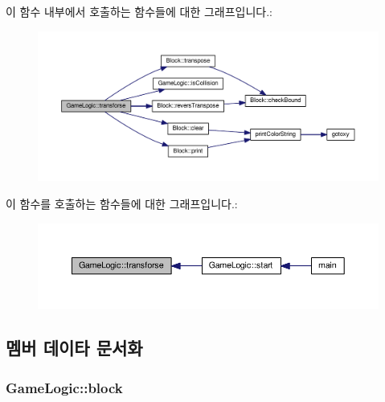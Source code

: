 이 함수 내부에서 호출하는 함수들에 대한 그래프입니다.\+:
\nopagebreak
\begin{figure}[H]
\begin{center}
\leavevmode
\includegraphics[width=350pt]{class_game_logic_abd2dece64def6dc89e0b116fdca83483_cgraph}
\end{center}
\end{figure}




이 함수를 호출하는 함수들에 대한 그래프입니다.\+:
\nopagebreak
\begin{figure}[H]
\begin{center}
\leavevmode
\includegraphics[width=350pt]{class_game_logic_abd2dece64def6dc89e0b116fdca83483_icgraph}
\end{center}
\end{figure}




\subsection{멤버 데이타 문서화}
\subsubsection[{\texorpdfstring{block}{block}}]{ Game\+Logic\+::block\hspace{0.3cm}{\ttfamily [private]}}\hypertarget{class_game_logic_a499d9b05317bb6a77bf3521f42a6638a}{}\label{class_game_logic_a499d9b05317bb6a77bf3521f42a6638a}


